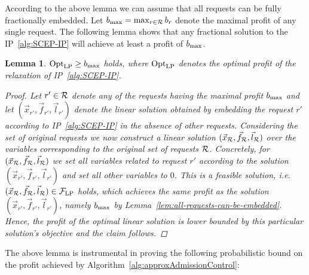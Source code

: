 \documentclass[10pt, conference, letterpaper]{IEEEtran}
\newtheorem{lemma}[theorem]{Lemma}
\begin{document}
According to the above lemma we can assume that all requests can be fully fractionally embedded.
Let $b_{\max} = \max_{r \in \mathcal{R}} b_{r}$ denote the maximal profit of any single request. The following lemma shows that any fractional solution to the IP~\ref{alg:SCEP-IP} will achieve at least a profit of $b_{\max}$.

\begin{lemma}
\label{lem:expected-profit-larger-max}
$\textnormal{Opt}_{\textnormal{LP}} \geq b_{\max}$ holds, where $\textnormal{Opt}_{\textnormal{LP}}$ denotes the optimal profit of the relaxation of IP~\ref{alg:SCEP-IP}.
\begin{proof}
Let $r' \in \mathcal{R}$ denote any of the requests having the maximal profit $b_{\max}$ and let $(\vec{x}_{r'}, \vec{f}_{r'}, \vec{l}_{r'})$ denote the linear solution obtained by embedding the request $r'$ according to IP~\ref{alg:SCEP-IP} in the absence of other requests. Considering the set of original requests we now construct a linear solution $(\vec{x}_{\mathcal{R}}, \vec{f}_{\mathcal{R}}, \vec{l}_{\mathcal{R}})$ over the variables corresponding to the original set of requests $\mathcal{R}$. Concretely, for $(\vec{x}_{\mathcal{R}}, \vec{f}_{\mathcal{R}}, \vec{l}_{\mathcal{R}})$ we set all variables related to request $r'$  according to the solution $(\vec{x}_{r'}, \vec{f}_{r'}, \vec{l}_{r'})$ and set all other variables to $0$. This is a feasible solution, i.e. $(\vec{x}_{\mathcal{R}}, \vec{f}_{\mathcal{R}}, \vec{l}_{\mathcal{R}}) \in  \mathcal{F}_{\textnormal{LP}}$ holds, which achieves the same profit as the solution $(\vec{x}_{r'}, \vec{f}_{r'}, \vec{l}_{r'})$, namely $b_{\max}$ by Lemma~\ref{lem:all-requests-can-be-embedded}. Hence, the profit of the optimal linear solution is lower bounded by this particular solution's objective and the claim follows.
\end{proof}
\end{lemma}

The above lemma is instrumental in proving the following probabilistic bound on the profit achieved by Algorithm~\ref{alg:approxAdmissionControl}:
\end{document}

